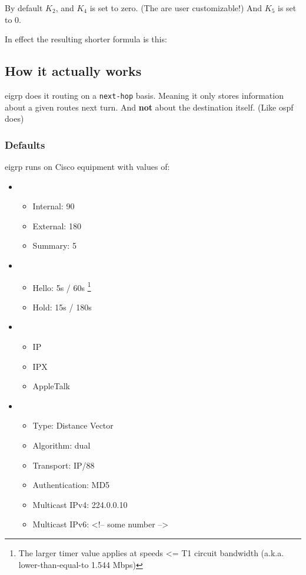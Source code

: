 
By default $K_2$, and $K_4$ is set to zero. (The are user customizable!) And $K_5$ is set to 0.

In effect the resulting shorter formula is this:


\subsection{How it actually works}

\gls{eigrp} does it routing on a \texttt{next-hop} basis. Meaning it only stores information about a given routes next turn. And \textbf{not} about the destination itself. (Like \gls{ospf} does)

\subsubsection{Defaults}

\gls{eigrp} runs on Cisco equipment with values of:
\begin{itemize}
    \item {}
    \begin{itemize}
        \item Internal: 90
        \item External: 180
        \item Summary: 5
    \end{itemize}
    \item {}
    \begin{itemize}
        \item Hello: 5s / 60s \footnote{The larger timer value applies at speeds <= T1 circuit bandwidth (a.k.a. lower-than-equal-to 1.544 Mbps)}
        \item Hold: 15s / 180s
    \end{itemize}
    \item {}
    \begin{itemize}
        \item IP
        \item IPX
        \item AppleTalk
    \end{itemize}
    \item {}
    \begin{itemize}
        \item Type: Distance Vector
        \item Algorithm: \gls{dual}
        \item Transport: IP/88
        \item Authentication: MD5
        \item Multicast IPv4: 224.0.0.10
        \item Multicast IPv6: <!-- some number -->
    \end{itemize}
\end{itemize}

